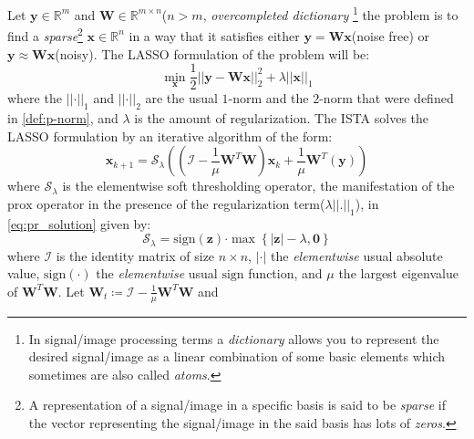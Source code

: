 Let $\boldsymbol{y} \in \mathbb{R}^m$ and $\boldsymbol{W} \in \mathbb{R}^{m \times n}$($n > m$, \emph{overcompleted dictionary}
\footnote{In signal/image processing terms a \emph{dictionary} allows you to represent the desired signal/image as a linear combination of some basic elements which sometimes are also called \emph{atoms}.}
the \srp\index{\srp} problem is to find a \emph{sparse}\footnote{A representation of a signal/image in a specific basis is said to be \emph{sparse} if 
the vector representing the signal/image in the said basis has lots of \emph{zeros}.} 
$\boldsymbol{x} \in \mathbb{R}^n$ in a way that it satisfies either $\boldsymbol{y} = \boldsymbol{W}\boldsymbol{x}$(noise free) or $\boldsymbol{y} \approx \boldsymbol{W}\boldsymbol{x}$(noisy).
The \ac{LASSO}\cite{Hastie2009} formulation of the problem will be:
\begin{equation}
  \min_{\boldsymbol{x}} \frac{1}{2} \left|\left|\boldsymbol{y}-\boldsymbol{W}\boldsymbol{x}\right|\right|_2^2 + \lambda \left|\left|\boldsymbol{x}\right|\right|_1
\end{equation}
where the $\left|\left|\boldsymbol{\cdot}\right|\right|_1$ and $\left|\left|\boldsymbol{\cdot}\right|\right|_2$ are the usual $1$-norm and the $2$-norm that were defined in \cref{def:p-norm}, and $\lambda$ is the amount of regularization\cite{Hastie2009}. 
The \ac{ISTA}\cite{Daubechies2003} solves the \ac{LASSO}\cite{Hastie2009} formulation by an iterative algorithm of the form:
\begin{equation}
  \boldsymbol{x}_{k+1} = \mathcal{S}_\lambda\left(\left(\mathcal{I}-\frac{1}{\mu}\boldsymbol{W}^T\boldsymbol{W}\right)\boldsymbol{x}_k+\frac{1}{\mu}\boldsymbol{W}^T\left(\boldsymbol{y}\right)\right)
\end{equation}
where $\mathcal{S}_\lambda$ is the elementwise soft thresholding operator, the manifestation of the $\mathrm{prox}$ operator in 
the presence of the regularization term($\lambda\left|\left|\boldsymbol{.}\right|\right|_1$), in \cref{eq:pr_solution} given by:
\begin{equation}
  \mathcal{S}_\lambda = \mathrm{sign}(\boldsymbol{z}) \boldsymbol{\cdot} \max \left\{\left|\boldsymbol{z}\right|-\lambda,\boldsymbol{0}\right\}
\end{equation}
where $\mathcal{I}$ is the identity matrix of size $n \times n$, $\left|\boldsymbol{\cdot}\right|$ the \emph{elementwise} usual absolute value, 
$\mathrm{sign}(\boldsymbol{\cdot})$ the \emph{elementwise} usual $\mathrm{sign}$ function, and $\mu$ the largest eigenvalue of $\boldsymbol{W}^T\boldsymbol{W}$. Let $\boldsymbol{W}_t \coloneqq \mathcal{I}-\frac{1}{\mu}\boldsymbol{W}^T\boldsymbol{W}$ and 
